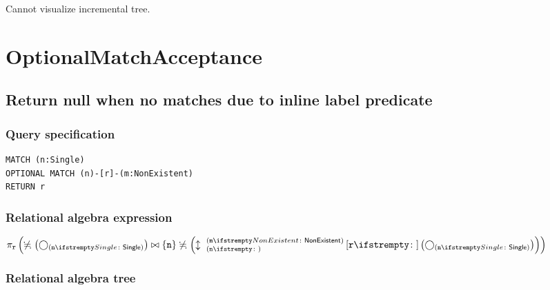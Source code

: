 Cannot visualize incremental tree.

\section{OptionalMatchAcceptance}

\subsection{Return null when no matches due to inline label predicate}

\subsubsection*{Query specification}

\begin{lstlisting}
MATCH (n:Single)
OPTIONAL MATCH (n)-[r]-(m:NonExistent)
RETURN r
\end{lstlisting}

\subsubsection*{Relational algebra expression}

$\projection{\var{r}} \left(\alldifferent{} \left(\getvertices{n}{Single}\right) \join \{\var{n}\} \alldifferent{} \left(\expandboth{n}{m}{NonExistent}{r}{} \left(\getvertices{n}{Single}\right)\right)\right)$

\subsubsection*{Relational algebra tree}


